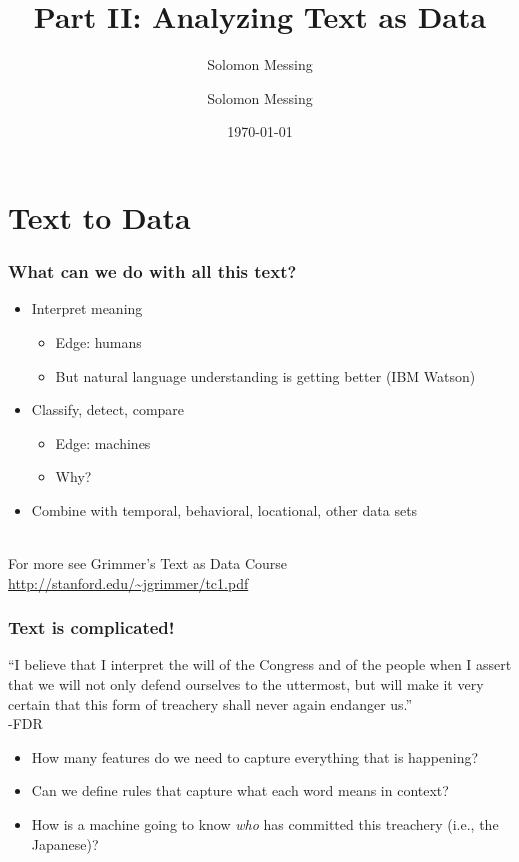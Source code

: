 \documentclass[]{beamer}
\title{Part II: Analyzing Text as Data}    %
\author{Solomon Messing}                 %
\author[]{Solomon Messing}
\institute{Department of Communication, Statistics\\ Stanford Social Science Data and Software (SSDS)}%
\date{\today}                    %
\begin{document}
\begin{frame}
  \titlepage
\end{frame}


\section{Text to Data}
\setcounter{subsection}{1}

\begin{frame}
  \frametitle{What can we do with all this text?}   %
  \begin{itemize}
  \item Interpret meaning
    \begin{itemize}
    \item Edge: humans
    \item But natural language understanding is getting better (IBM Watson)
    \end{itemize}
  \item Classify, detect, compare
    \begin{itemize}
    \item Edge: machines
    \item Why?
    \end{itemize}  
  \item Combine with temporal, behavioral, locational, other data sets
  \end{itemize}
~\\ \footnotesize For more see Grimmer's Text as Data Course \url{http://stanford.edu/~jgrimmer/tc1.pdf}
\end{frame}

\begin{frame}
  \frametitle{Text is complicated!}   %
``I believe that I interpret the will of the Congress and of the people when I assert that we will not only defend ourselves to the uttermost, but will make it very certain that this form of treachery shall never again endanger us.''\\
-FDR
  \begin{itemize}
  \item How many features do we need to capture everything that is happening?  
  \item Can we define rules that capture what each word means in context?
  \item How is a machine going to know \emph{who} has committed this treachery (i.e., the Japanese)? 
  \end{itemize}
\end{frame}
\end{document}
